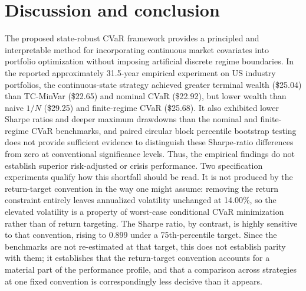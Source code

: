 \documentclass[smallcondensed]{svjour3}
\begin{document}
\section{Discussion and conclusion}\label{sec:conclusion}
The proposed state-robust CVaR framework provides a principled and interpretable method for incorporating continuous market covariates into portfolio optimization without imposing artificial discrete regime boundaries. In the reported approximately 31.5-year empirical experiment on US industry portfolios, the continuous-state strategy achieved greater terminal wealth (\$25.04) than TC-MinVar (\$22.65) and nominal CVaR (\$22.92), but lower wealth than naive $1/N$ (\$29.25) and finite-regime CVaR (\$25.68). It also exhibited lower Sharpe ratios and deeper maximum drawdowns than the nominal and finite-regime CVaR benchmarks, and paired circular block percentile bootstrap testing does not provide sufficient evidence to distinguish these Sharpe-ratio differences from zero at conventional significance levels. Thus, the empirical findings do not establish superior risk-adjusted or crisis performance. Two specification experiments qualify how this shortfall should be read. It is not produced by the return-target convention in the way one might assume: removing the return constraint entirely leaves annualized volatility unchanged at 14.00\%, so the elevated volatility is a property of worst-case conditional CVaR minimization rather than of return targeting. The Sharpe ratio, by contrast, is highly sensitive to that convention, rising to 0.899 under a 75th-percentile target. Since the benchmarks are not re-estimated at that target, this does not establish parity with them; it establishes that the return-target convention accounts for a material part of the performance profile, and that a comparison across strategies at one fixed convention is correspondingly less decisive than it appears.
\end{document}
